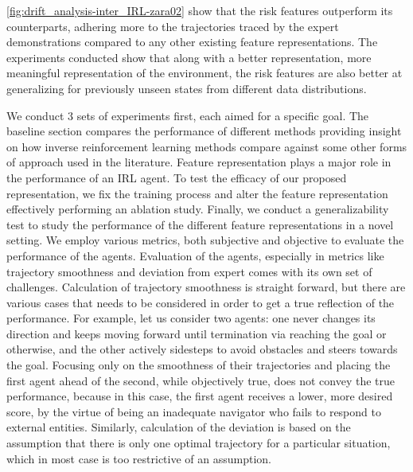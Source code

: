 \autoref{fig:drift_analysis-inter_IRL-zara02} show that the risk features outperform its counterparts, adhering more to the trajectories traced by the expert demonstrations compared to any other existing feature representations. The experiments conducted show that along with a better representation, more meaningful representation of the environment, the risk features are also better at generalizing for previously unseen states from different data distributions.

We conduct $3$ sets of experiments first, each aimed for a specific goal. The baseline section compares the performance of different methods providing insight on how inverse reinforcement learning methods compare against some other forms of approach used in the literature. Feature representation plays a major role in the performance of an IRL agent. To test the efficacy of our proposed representation, we fix the training process and alter the feature representation effectively performing an ablation study. Finally, we conduct a generalizability test to study the performance of the different feature representations in a novel setting. We employ various metrics, both subjective and objective to evaluate the performance of the agents. Evaluation of the agents, especially in metrics like trajectory smoothness and deviation from expert comes with its own set of challenges. Calculation of trajectory smoothness is straight forward, but there are various cases that needs to be considered in order to get a true reflection of the performance. For example, let us consider two agents: one never changes its direction and keeps moving forward until termination via reaching the goal or otherwise, and the other actively sidesteps to avoid obstacles and steers towards the goal. Focusing only on the smoothness of their trajectories and placing the first agent ahead of the second, while objectively true, does not convey the true performance, because in this case, the first agent receives a lower, more desired score, by the virtue of being an inadequate navigator who fails to respond to external entities. Similarly, calculation of the deviation is based on the assumption that there is only one optimal trajectory for a particular situation, which in most case is too restrictive of an assumption.
%
%
%
